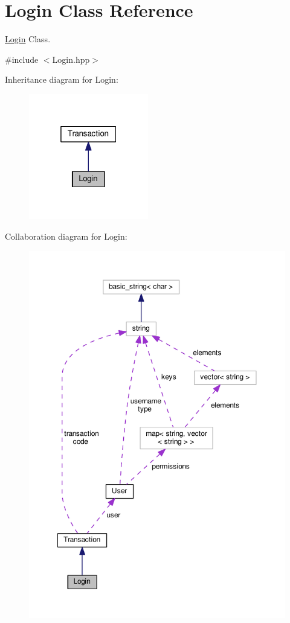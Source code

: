 \hypertarget{class_login}{\section{Login Class Reference}
\label{class_login}
}


\hyperlink{class_login}{Login} Class.  




{\ttfamily \#include $<$Login.\-hpp$>$}



Inheritance diagram for Login\-:
\nopagebreak
\begin{figure}[H]
\begin{center}
\leavevmode
\includegraphics[width=148pt]{class_login__inherit__graph}
\end{center}
\end{figure}


Collaboration diagram for Login\-:
\nopagebreak
\begin{figure}[H]
\begin{center}
\leavevmode
\includegraphics[width=350pt]{class_login__coll__graph}
\end{center}
\end{figure}
